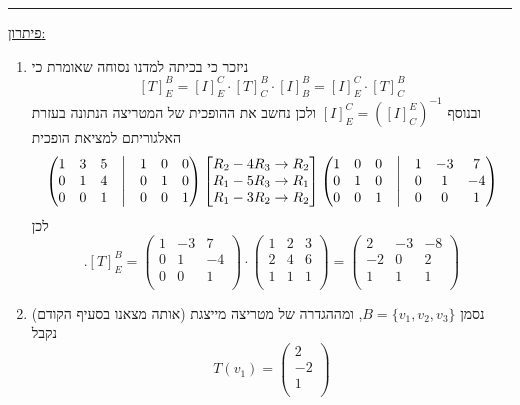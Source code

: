 \documentclass[12pt, a4paper]{article}
\begin{document}
\begin{enumerate}
    \thirdQ
    \noindent\rule{\textwidth-30pt}{0.4pt}
    \underline{פיתרון:}
\begin{enumerate}
    \item 
    ניזכר כי בכיתה למדנו נסוחה שאומרת כי 
    $$[T]_E^B=[I]^C_E\cdot [T]_C^B\cdot [I]_B^B=[I]^C_E\cdot [T]^B_C$$
    ובנוסף
    $[I]_E^C=([I]_C^E)^{-1}$
    ולכן נחשב את ההופכית של המטריצה הנתונה בעזרת האלגוריתם למציאת הופכית
    \begin{align*}
\begin{pmatrix}
    1&3&5&\bigm|&1&0&0\\
    0&1&4&\bigm|&0&1&0\\
    0&0&1&\bigm|&0&0&1\\
\end{pmatrix}
\begin{bmatrix}
    R_2-4R_3\rightarrow R_2\\
    R_1-5R_3\rightarrow R_1\\
    R_1-3R_2\rightarrow R_2\\
\end{bmatrix}
\begin{pmatrix}
    1&0&0&\bigm|&1&-3&7\\
    0&1&0&\bigm|&0&1&-4\\
    0&0&1&\bigm|&0&0&1\\
\end{pmatrix}
    \end{align*}
    לכן
    $$.[T]_E^B=
    \begin{pmatrix}
      1&-3&7\\
      0&1&-4\\
      0&0&1\\
    \end{pmatrix}\cdot
     \begin{pmatrix}
        1 & 2 & 3 \\
        2 & 4 & 6 \\
        1 & 1 & 1 \\
    \end{pmatrix}
    =\begin{pmatrix}
    2&-3&-8\\
    -2&0&2\\
    1&1&1\\
    \end{pmatrix}
    $$
    \item 
    נסמן
    $B=\{v_1,v_2,v_3\}$,
ומההגדרה של מטריצה מייצגת
(אותה מצאנו בסעיף הקודם)
נקבל
$$T(v_1)=\begin{pmatrix}
    2\\-2\\1\\

\end{pmatrix}$$
\end{enumerate}
\end{enumerate}
\end{document}
